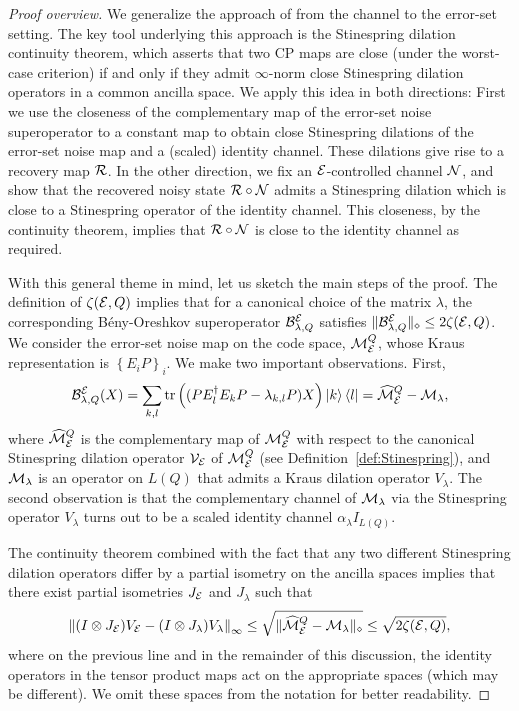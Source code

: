\documentclass[10pt]{article}
\newcommand{\tr}{\mathrm{tr}}
\newcommand{\p}[1]{\left(#1\right)}
\newcommand{\ppp}[1]{\left\{#1\right\}}
\newcommand{\norm}[1]{\left\|#1\right\|}
\begin{document}
\begin{proof}[Proof overview] We generalize the approach of \cite{Kretschmann2008Information} from the channel to the error-set setting. The key tool underlying this approach is the Stinespring dilation continuity theorem, which asserts that two CP maps are  close (under the worst-case criterion) if and only if they admit $\infty$-norm close Stinespring dilation operators in a common ancilla space. We apply this idea in both directions: First we use the closeness of the complementary map of the error-set noise superoperator to a constant map to obtain close Stinespring dilations of the error-set noise map and a (scaled) identity channel. These dilations give rise to a recovery map ${\cal R}$. In the other direction, we fix an ${\cal E}$-controlled channel ${\cal N}$, and show that the recovered noisy state ${\cal R}\circ{\cal N}$  admits a Stinespring dilation  which is close to a Stinespring operator of the identity channel. This closeness, by the continuity theorem, implies that ${\cal R}\circ{\cal N}$ is close to the identity channel as required.


With this general theme in mind, let us sketch the main steps of the proof. The definition of $\zeta({\cal E},Q)$ implies that for a canonical choice of the matrix $\lambda$, the corresponding  B\'eny-Oreshkov superoperator ${\cal B}_{\lambda,Q}^{{\cal E}}$  satisfies $\|{\cal B}_{\lambda,Q}^{{\cal E}} \|_{\diamond}\leq 2\zeta({\cal E},Q)$.  We consider the error-set noise map on the code space, ${\cal M}_{{\cal E}}^Q$, whose Kraus representation is $\ppp{E_iP}_i$. We make two important observations. First,
\[\calB^{\calE}_{\lambda,Q}(X)= \sum_{k,l}\tr\p{( PE_l^\dag E_kP-\lambda_{k,l}P)X}\ket{k}\bra{l}=\widehat{\calM}_{\calE}^Q-\calM_\lambda,\]
where $\widehat{{\cal M}}_{{\cal E}}^Q$ is the complementary map of ${\cal M}_{{\cal E}}^Q$ with respect to the canonical Stinespring dilation operator ${\cal V}_{{\cal E}}$  of ${\cal M}_{{\cal E}}^Q$ (see Definition~\ref{def:Stinespring}), and ${\cal M}_{\lambda}$ is an operator on $L(Q)$ that admits a Kraus dilation operator $V_{\lambda}$. The second observation is that the complementary channel of ${\cal M}_{\lambda}$ via the Stinespring operator $V_{\lambda}$ turns out to be a scaled identity channel $\alpha_\lambda  I_{L(Q)}$. 

The continuity theorem combined with the fact that any two different Stinespring dilation operators differ by a partial isometry on the ancilla spaces implies that there exist partial isometries $J_{{\cal E}}$ and $J_{\lambda}$ such that 
\begin{equation}
    \norm{(I\otimes J_{\calE} )V_{\calE}-(I\otimes J_\lambda )V_{\lambda}}_{\infty}\leq \sqrt{\| \widehat{\calM}_{\calE}^Q-\calM_{\lambda}\|_{\diamond}}\leq \sqrt{2\zeta(\calE,Q)},\label{eq:ContinuityMotivation}
\end{equation}
where on the previous line and in the remainder of this discussion, the identity operators in the tensor product maps 
act on the appropriate spaces (which may be different). We omit these spaces from the notation for better readability.


\end{proof}
\end{document}
